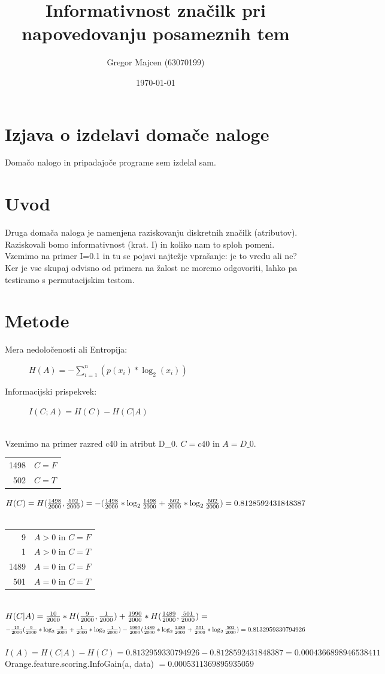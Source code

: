 \documentclass[a4paper,11pt]{article}
\title{Informativnost značilk pri napovedovanju posameznih tem}
\author{Gregor Majcen (63070199)}
\date{\today}
\begin{document}
\maketitle

\section{Izjava o izdelavi domače naloge}
Domačo nalogo in pripadajoče programe sem izdelal sam.

\section{Uvod}
Druga domača naloga je namenjena raziskovanju diskretnih značilk (atributov). Raziskovali bomo informativnost (krat. I) in koliko nam to sploh pomeni. Vzemimo na primer I=0.1 in tu se pojavi najtežje vprašanje: je to vredu ali ne? Ker je vse skupaj odvisno od primera na žalost ne moremo odgovoriti, lahko pa testiramo s permutacijskim testom.

\section{Metode}
\begin{description}
\item[Mera nedoločenosti ali Entropija: ]$H(A) = -\sum_{i=1}^n(p(x_i) * \log_2(x_i))$
\item[Informacijski prispekvek: ] $I(C;A) = H(C) - H(C|A)$
\end{description}
\ \\
Vzemimo na primer razred c40 in atribut D\_0. $C = c40$ in $A = D\_0$. 
\ \\
\begin{tabular}{|r|l|}
  \hline
  1498 & $C=F$ \\
  502 & $C=T$ \\
  \hline
\end{tabular}
$H(C) = H({1498\over2000}, {502\over2000}) = -({1498\over2000}*\log_2{1498\over2000} + {502\over2000}*\log_2{502\over2000}) = 0.8128592431848387$
\ \\
\begin{tabular}{|r|l|}
  \hline
  9 & $A>0$ in $C=F$ \\
  1 & $A>0$ in $C=T$ \\
  1489 & $A=0$ in $C=F$ \\
  501 & $A=0$ in $C=T$ \\
  \hline
\end{tabular}
\ \\
$H(C|A) = {10\over2000}*H({9\over2000}, {1\over2000}) + {1990\over2000}*H({1489\over2000}, {501\over2000}) =$
$ -{10\over2000}({9\over2000}*\log_2{9\over2000} + {1\over2000}*\log_2{1\over2000}) - {1990\over2000}({1489\over2000}*\log_2{1489\over2000} + {501\over2000}*\log_2{501\over2000}) = 0.8132959330794926$
\ \\
$I(A) = H(C|A) - H(C) = 0.8132959330794926 - 0.8128592431848387 = 0.0004366898946538411$
Orange.feature.scoring.InfoGain(a, data) $ = 0.0005311369895935059$
\end{document}
